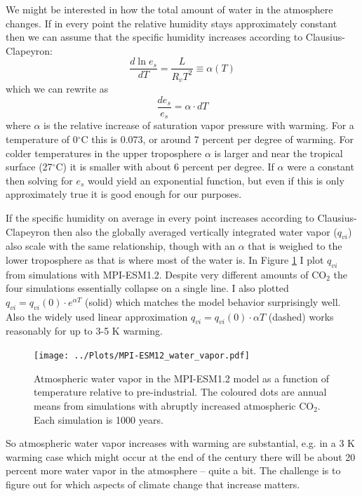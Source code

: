 \documentclass[12pt]{book}
\begin{document}
We might be interested in how the total amount of water in the atmosphere changes. If in every point the relative humidity stays approximately constant then we can assume that the specific humidity increases according to Clausius-Clapeyron:
$$\frac{d\ln e_s}{dT} = \frac{L}{R_v T^2} \equiv \alpha(T) $$
which we can rewrite as 
$$ \frac{d e_s}{e_s} = \alpha \cdot dT$$
where $\alpha$ is the relative increase of saturation vapor pressure with warming. For a temperature of 0$^\circ$C this is 0.073, or around 7 percent per degree of warming. For colder temperatures in the upper troposphere $\alpha$ is larger and near the tropical surface (27$^\circ$C) it is smaller with about 6 percent per degree. If $\alpha$ were a constant then solving for $e_s$ would yield an exponential function, but even if this is only approximately true it is good enough for our purposes. 

If the specific humidity on average in every point increases according to Clausius-Clapeyron then also the globally averaged vertically integrated water vapor ($q_{vi}$) also scale with the same relationship, though with an $\alpha$ that is weighed to the lower troposphere as that is where most of the water is. In Figure \ref{fig:mpi-esm12_water_vapor} I plot $q_{vi}$ from simulations with MPI-ESM1.2. Despite very different amounts of CO$_2$ the four simulations essentially collapse on a single line. I also plotted $q_{vi} = q_{vi}(0) \cdot e^{\alpha T}$ (solid) which matches the model behavior surprisingly well. Also the widely used linear approximation $q_{vi} = q_{vi}(0) \cdot \alpha T$ (dashed) works reasonably for up to 3-5 K warming.

\begin{figure}
\begin{center}
\texttt{[image: ../Plots/MPI-ESM12\_water\_vapor.pdf]}
\end{center}
\caption{ Atmospheric water vapor in the MPI-ESM1.2 model as a function of temperature relative to pre-industrial. The coloured dots are annual means from simulations with abruptly increased atmospheric CO$_2$. Each simulation is 1000 years. } 
\label{fig:mpi-esm12_water_vapor}
\end{figure}

So atmospheric water vapor increases with warming are substantial, e.g. in a 3 K warming case which might occur at the end of the century there will be about 20 percent more water vapor in the atmosphere -- quite a bit. The challenge is to figure out for which aspects of climate change that increase matters.
\end{document}
